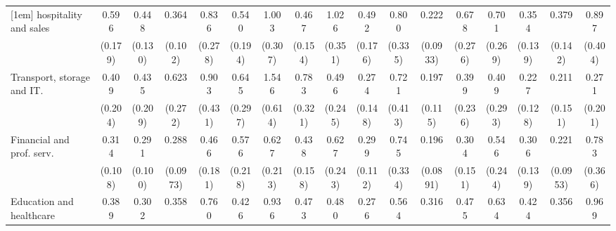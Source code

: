 {\begin{tabular}{l*{16}{c}}
[1em]
hospitality and sales&       0.596         &       0.448\sym{**} &       0.364\sym{***}&       0.836         &       0.540         &       1.003         &       0.467\sym{*}  &       1.026         &       0.492\sym{*}  &       0.800         &       0.222\sym{***}&       0.678         &       0.701         &       0.354\sym{**} &       0.379\sym{**} &       0.897         \\
                    &     (0.179)         &     (0.130)         &     (0.102)         &     (0.278)         &     (0.194)         &     (0.307)         &     (0.154)         &     (0.351)         &     (0.176)         &     (0.335)         &    (0.0933)         &     (0.276)         &     (0.269)         &     (0.139)         &     (0.142)         &     (0.404)         \\
[1em]
Transport, storage and IT.&       0.409         &       0.435         &       0.623         &       0.903         &       0.645         &       1.546         &       0.783         &       0.496         &       0.274\sym{*}  &       0.721         &       0.197\sym{**} &       0.399         &       0.409         &       0.227\sym{**} &       0.211\sym{*}  &       0.271         \\
                    &     (0.204)         &     (0.209)         &     (0.272)         &     (0.431)         &     (0.297)         &     (0.614)         &     (0.321)         &     (0.245)         &     (0.148)         &     (0.413)         &     (0.115)         &     (0.236)         &     (0.293)         &     (0.128)         &     (0.151)         &     (0.201)         \\
[1em]
Financial and prof. serv.&       0.314\sym{***}&       0.291\sym{***}&       0.288\sym{***}&       0.466\sym{*}  &       0.576         &       0.627         &       0.438\sym{*}  &       0.627         &       0.299\sym{**} &       0.745         &       0.196\sym{***}&       0.304\sym{*}  &       0.546         &       0.306\sym{**} &       0.221\sym{***}&       0.783         \\
                    &     (0.108)         &     (0.100)         &    (0.0973)         &     (0.181)         &     (0.218)         &     (0.213)         &     (0.158)         &     (0.243)         &     (0.112)         &     (0.334)         &    (0.0891)         &     (0.151)         &     (0.244)         &     (0.139)         &    (0.0953)         &     (0.366)         \\
[1em]
Education and healthcare&       0.389\sym{**} &       0.302\sym{***}&       0.358\sym{**} &       0.760         &       0.426\sym{*}  &       0.936         &       0.473\sym{*}  &       0.480         &       0.276\sym{***}&       0.564         &       0.316\sym{**} &       0.475         &       0.634         &       0.424\sym{*}  &       0.356\sym{**} &       0.969         \\

\end{tabular}}
